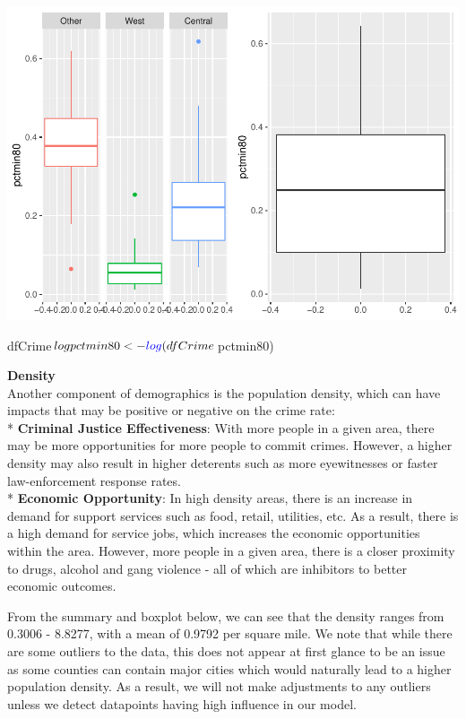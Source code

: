 \documentclass[]{article}
\newenvironment{Shaded}{}{}
\newcommand{\KeywordTok}[1]{\textcolor[rgb]{0.00,0.00,1.00}{#1}}
\newcommand{\NormalTok}[1]{#1}
\newcommand{\OperatorTok}[1]{#1}
\newcommand{\StringTok}[1]{\textcolor[rgb]{0.00,0.50,0.50}{#1}}
\begin{document}
\includegraphics{Bagnard_Gaustad_Hartman_Leung_Lab_3_files/figure-latex/unnamed-chunk-77-1.pdf}

\begin{Shaded}
\begin{Highlighting}[]
\NormalTok{dfCrime}\OperatorTok{$}\NormalTok{logpctmin80 <-}\StringTok{ }\KeywordTok{log}\NormalTok{(dfCrime}\OperatorTok{$}\NormalTok{pctmin80)}
\end{Highlighting}
\end{Shaded}

\textbf{Density}\\
Another component of demographics is the population density, which can
have impacts that may be positive or negative on the crime rate:\\
* \textbf{Criminal Justice Effectiveness}: With more people in a given
area, there may be more opportunities for more people to commit crimes.
However, a higher density may also result in higher deterents such as
more eyewitnesses or faster law-enforcement response rates.\\
* \textbf{Economic Opportunity}: In high density areas, there is an
increase in demand for support services such as food, retail, utilities,
etc. As a result, there is a high demand for service jobs, which
increases the economic opportunities within the area. However, more
people in a given area, there is a closer proximity to drugs, alcohol
and gang violence - all of which are inhibitors to better economic
outcomes.

From the summary and boxplot below, we can see that the density ranges
from 0.3006 - 8.8277, with a mean of 0.9792 per square mile. We note
that while there are some outliers to the data, this does not appear at
first glance to be an issue as some counties can contain major cities
which would naturally lead to a higher population density. As a result,
we will not make adjustments to any outliers unless we detect datapoints
having high influence in our model.
\end{document}

